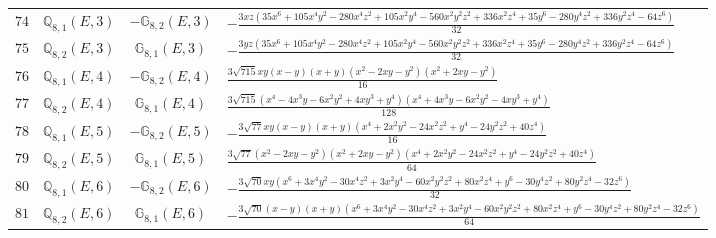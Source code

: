 \documentclass[fleqn,8pt,landscape]{jsarticle}
\begin{document}
\begin{table}[ht!]
\begin{center}
\begin{tabular}{cccl}
$ 74 $ & $ \mathbb{Q}_{8,1}(E,3) $ & $ -\mathbb{G}_{8,2}(E,3) $ & $ - \frac{3 x z \left(35 x^{6} + 105 x^{4} y^{2} - 280 x^{4} z^{2} + 105 x^{2} y^{4} - 560 x^{2} y^{2} z^{2} + 336 x^{2} z^{4} + 35 y^{6} - 280 y^{4} z^{2} + 336 y^{2} z^{4} - 64 z^{6}\right)}{32} $ \\
$ 75 $ & $ \mathbb{Q}_{8,2}(E,3) $ & $ \mathbb{G}_{8,1}(E,3) $ & $ - \frac{3 y z \left(35 x^{6} + 105 x^{4} y^{2} - 280 x^{4} z^{2} + 105 x^{2} y^{4} - 560 x^{2} y^{2} z^{2} + 336 x^{2} z^{4} + 35 y^{6} - 280 y^{4} z^{2} + 336 y^{2} z^{4} - 64 z^{6}\right)}{32} $ \\
$ 76 $ & $ \mathbb{Q}_{8,1}(E,4) $ & $ -\mathbb{G}_{8,2}(E,4) $ & $ \frac{3 \sqrt{715} x y \left(x - y\right) \left(x + y\right) \left(x^{2} - 2 x y - y^{2}\right) \left(x^{2} + 2 x y - y^{2}\right)}{16} $ \\
$ 77 $ & $ \mathbb{Q}_{8,2}(E,4) $ & $ \mathbb{G}_{8,1}(E,4) $ & $ \frac{3 \sqrt{715} \left(x^{4} - 4 x^{3} y - 6 x^{2} y^{2} + 4 x y^{3} + y^{4}\right) \left(x^{4} + 4 x^{3} y - 6 x^{2} y^{2} - 4 x y^{3} + y^{4}\right)}{128} $ \\
$ 78 $ & $ \mathbb{Q}_{8,1}(E,5) $ & $ -\mathbb{G}_{8,2}(E,5) $ & $ - \frac{3 \sqrt{77} x y \left(x - y\right) \left(x + y\right) \left(x^{4} + 2 x^{2} y^{2} - 24 x^{2} z^{2} + y^{4} - 24 y^{2} z^{2} + 40 z^{4}\right)}{16} $ \\
$ 79 $ & $ \mathbb{Q}_{8,2}(E,5) $ & $ \mathbb{G}_{8,1}(E,5) $ & $ \frac{3 \sqrt{77} \left(x^{2} - 2 x y - y^{2}\right) \left(x^{2} + 2 x y - y^{2}\right) \left(x^{4} + 2 x^{2} y^{2} - 24 x^{2} z^{2} + y^{4} - 24 y^{2} z^{2} + 40 z^{4}\right)}{64} $ \\
$ 80 $ & $ \mathbb{Q}_{8,1}(E,6) $ & $ -\mathbb{G}_{8,2}(E,6) $ & $ - \frac{3 \sqrt{70} x y \left(x^{6} + 3 x^{4} y^{2} - 30 x^{4} z^{2} + 3 x^{2} y^{4} - 60 x^{2} y^{2} z^{2} + 80 x^{2} z^{4} + y^{6} - 30 y^{4} z^{2} + 80 y^{2} z^{4} - 32 z^{6}\right)}{32} $ \\
$ 81 $ & $ \mathbb{Q}_{8,2}(E,6) $ & $ \mathbb{G}_{8,1}(E,6) $ & $ - \frac{3 \sqrt{70} \left(x - y\right) \left(x + y\right) \left(x^{6} + 3 x^{4} y^{2} - 30 x^{4} z^{2} + 3 x^{2} y^{4} - 60 x^{2} y^{2} z^{2} + 80 x^{2} z^{4} + y^{6} - 30 y^{4} z^{2} + 80 y^{2} z^{4} - 32 z^{6}\right)}{64} $ \\
 \hline \hline
\end{tabular}
\end{center}
\end{table}
\end{document}
